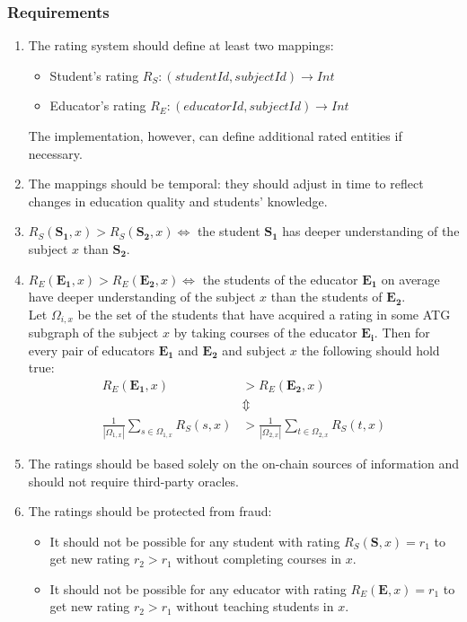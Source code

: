 \subsubsection*{Requirements}
\begin{enumerate}
  \item The rating system should define at least two mappings:
    \begin{itemize}
      \item Student's rating $R_S: (studentId, subjectId) \rightarrow Int$
      \item Educator's rating $R_E: (educatorId, subjectId) \rightarrow Int$
    \end{itemize}
    The implementation, however, can define additional rated entities if necessary.
  \item The mappings should be temporal: they should adjust in time to reflect changes in education quality and students' knowledge.
  \item $R_S(\mathbf{S_1}, x) > R_S(\mathbf{S_2}, x) \iff$ the student $\mathbf{S_1}$ has deeper understanding of the subject $x$ than $\mathbf{S_2}$.
  \item $R_E(\mathbf{E_1}, x) > R_E(\mathbf{E_2}, x) \iff$ the students of the educator $\mathbf{E_1}$ on average have deeper understanding of the subject $x$ than the students of $\mathbf{E_2}$. \\ Let $\Omega_{i, x}$ be the set of the students that have acquired a rating in some ATG subgraph of the subject $x$ by taking courses of the educator $\mathbf{E_i}$. Then for every pair of educators $\mathbf{E_1}$ and $\mathbf{E_2}$ and subject $x$ the following should hold true:
    \begin{align*}
      R_E(\mathbf{E_1}, x) &> R_E(\mathbf{E_2}, x) \\
      &\Updownarrow\\
      \frac{1}{|\Omega_{1, x}|} \sum_{s \in \Omega_{1, x}} R_S(s, x) &>
      \frac{1}{|\Omega_{2, x}|} \sum_{t \in \Omega_{2, x}} R_S(t, x)
    \end{align*}
  \item The ratings should be based solely on the on-chain sources of information and should not require third-party oracles.
  \item The ratings should be protected from fraud:
  \begin{itemize}
  	\item It should not be possible for any student with rating $R_S(\mathbf{S}, x) = r_1$ to get new rating $r_2 > r_1$ without completing courses in $x$.
  	\item It should not be possible for any educator with rating $R_E(\mathbf{E}, x) = r_1$ to get new rating $r_2 > r_1$ without teaching students in $x$.
  \end{itemize}

\end{enumerate}
